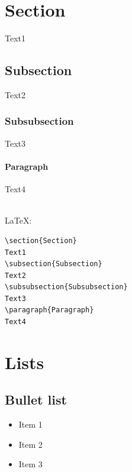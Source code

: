\documentclass[12pt,nonacm,acmlarge,titlepage,screen]{acmart}
\begin{document}
\noindent\begin{minipage}[t]{\textwidth}
\section{Section}
Text1
\subsection{Subsection}
Text2
\subsubsection{Subsubsection}
Text3
\paragraph{Paragraph}
Text4
\end{minipage}~\\

\noindent\LaTeX:
\begin{Verbatim}[frame=single]
\section{Section}
Text1
\subsection{Subsection}
Text2
\subsubsection{Subsubsection}
Text3
\paragraph{Paragraph}
Text4
\end{Verbatim}

\section*{Lists}

\subsection*{Bullet list}

\begin{itemize}
    \item Item 1
    \item Item 2
    \item[$\checkmark$] Item 3 
\end{itemize}
\end{document}
